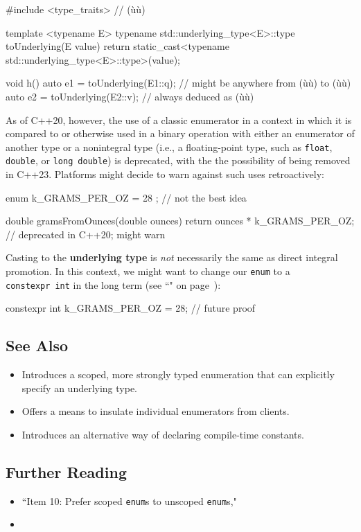 \begin{emcppslisting}[emcppsbatch=e2]
#include <type_traits>  // (ù{}ù)

template <typename E>
typename std::underlying_type<E>::type toUnderlying(E value)
{
    return static_cast<typename std::underlying_type<E>::type>(value);
}

void h()
{
    auto e1 = toUnderlying(E1::q); // might be anywhere from (ù{}ù) to (ù{}ù)
    auto e2 = toUnderlying(E2::v); // always deduced as (ù{}ù)
}
\end{emcppslisting}

\noindent As of C++20, however, the use of a classic enumerator in a context in
which it is compared to or otherwise used in a binary operation with
either an enumerator of another type or a nonintegral type (i.e., a
floating-point type, such as \texttt{float}, \texttt{double}, or
\texttt{long}~\texttt{double}) is deprecated, with the the possibility
of being removed in C++23. Platforms might decide to warn against such
uses retroactively:

\begin{emcppslisting}
enum { k_GRAMS_PER_OZ = 28 };  // not the best idea

double gramsFromOunces(double ounces)
{
    return ounces * k_GRAMS_PER_OZ;  // deprecated in C++20; might warn
}
\end{emcppslisting}

\noindent Casting to the \textbf{underlying type} is \emph{not} necessarily the
same as direct integral promotion. In this context, we might want to
change our \texttt{enum} to a
\texttt{constexpr}~\texttt{int} in the long
term (see
  ``" on page~\pageref{constexprvar}):

\begin{emcppslisting}
constexpr int k_GRAMS_PER_OZ = 28;  // future proof
\end{emcppslisting}


\subsection[See Also]{See Also}\label{see-also}

\begin{itemize}
\item{Introduces a scoped, more strongly typed enumeration that can explicitly specify an underlying type.}
\item{Offers a means to insulate individual enumerators from clients.}
\item{Introduces an alternative way of declaring compile-time constants.}
\end{itemize}

\subsection[Further Reading]{Further Reading}\label{further-reading}

\begin{itemize}
\item{``Item 10: Prefer scoped \texttt{enum}s to unscoped \texttt{enum}s," \cite{meyers15}}
\item{\cite{grimm17}}
\end{itemize}

